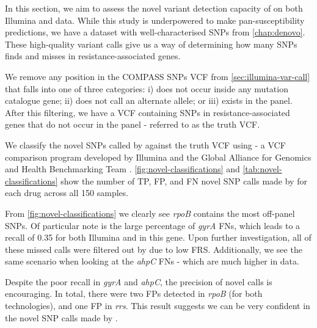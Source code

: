 In this section, we aim to assess the novel variant detection capacity of \drprg{} on both Illumina and \ont{} data. While this study is underpowered to make pan-susceptibility predictions, we have a dataset with well-characterised SNPs from \autoref{chap:denovo}. These high-quality variant calls give us a way of determining how many SNPs \drprg{} finds and misses in resistance-associated genes. 

We remove any position in the COMPASS SNPs VCF from \autoref{sec:illumina-var-call} that falls into one of three categories: i) does not occur inside any mutation catalogue gene; ii) does not call an alternate allele; or iii) exists in the panel. After this filtering, we have a VCF containing SNPs in resistance-associated genes that do not occur in the panel - referred to as the truth VCF.

We classify the novel SNPs called by \drprg{} against the truth VCF using  - a VCF comparison program developed by Illumina and the Global Alliance for Genomics and Health Benchmarking Team \cite{happy2019}. \autoref{fig:novel-classifications} and \autoref{tab:novel-classifications} show the number of TP, FP, and FN novel SNP calls made by \drprg{} for each drug across all 150 samples. 

From \autoref{fig:novel-classifications} we clearly see \textit{rpoB} contains the most off-panel SNPs. Of particular note is the large percentage of \textit{gyrA} FNs, which leads to a recall of 0.35 for both Illumina and \ont{} in this gene. Upon further investigation, all of these missed calls were filtered out by \drprg{} due to low FRS. Additionally, we see the same scenario when looking at the \textit{ahpC} FNs - which are much higher in \ont{} data. 

Despite the poor recall in \textit{gyrA} and \textit{ahpC}, the precision of novel \drprg{} calls is encouraging. In total, there were two FPs detected in \textit{rpoB} (for both technologies), and one \ont{} FP in \textit{rrs}. This result suggests we can be very confident in the novel SNP calls made by \drprg{}.

